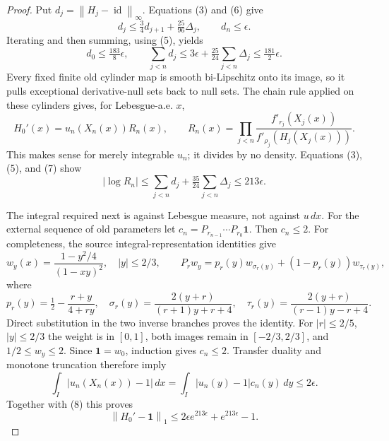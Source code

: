 \documentclass[11pt]{article}
\newcommand{\norm}[1]{\left\lVert#1\right\rVert}
\newcommand{\one}{\mathbf 1}
\DeclareMathOperator{\id}{id}
\begin{document}
\begin{proof}
Put $d_j=\norm{H_j-\id}_\infty$. Equations (3) and (6) give
\[
 d_j\le\tfrac34d_{j+1}+\tfrac{25}{96}\Delta_j,\qquad d_n\le\epsilon.
\]
Iterating and then summing, using (5), yields
\[
 d_0\le\tfrac{183}{8}\epsilon,\qquad
 \sum_{j<n}d_j\le3\epsilon+\tfrac{25}{24}\sum_{j<n}\Delta_j
                  \le\tfrac{181}{2}\epsilon.          \tag{7}\label{eq:d}
\]
Every fixed finite old cylinder map is smooth bi-Lipschitz onto its image,
so it pulls exceptional derivative-null sets back to null sets. The chain
rule applied on these cylinders gives, for Lebesgue-a.e. $x$,
\[
 H_0'(x)=u_n(X_n(x))R_n(x),\qquad
 R_n(x)=\prod_{j<n}
   \frac{f'_{r_j}(X_j(x))}{f'_{\rho_j}(H_j(X_j(x)))}.
\]
This makes sense for merely integrable $u_n$; it divides by no density.
Equations (3), (5), and (7) show
\[
 |\log R_n|\le\sum_{j<n}d_j+\tfrac{35}{24}\sum_{j<n}\Delta_j
                 \le213\epsilon.                     \tag{8}\label{eq:log}
\]

The integral required next is against Lebesgue measure, not against $u\,dx$.
For the external sequence of old parameters let
$c_n=P_{r_{n-1}}\cdots P_{r_0}\one$. Then $c_n\le2$. For completeness, the
source integral-representation identities \cite[Section~4.1]{BKZ} give
\[
 w_y(x)=\frac{1-y^2/4}{(1-xy)^2},\quad |y|\le2/3,\qquad
 P_rw_y=p_r(y)w_{\sigma_r(y)}+(1-p_r(y))w_{\tau_r(y)},
\]
where
\[
 p_r(y)=\tfrac12-\frac{r+y}{4+ry},\quad
 \sigma_r(y)=\frac{2(y+r)}{(r+1)y+r+4},\quad
 \tau_r(y)=\frac{2(y+r)}{(r-1)y-r+4}.
\]
Direct substitution in the two inverse branches proves the identity.
For $|r|\le2/5$, $|y|\le2/3$ the weight is in $[0,1]$, both images remain
in $[-2/3,2/3]$, and $1/2\le w_y\le2$.
Since $\one=w_0$, induction gives $c_n\le2$.
Transfer duality and monotone truncation therefore imply
\[
 \int_I|u_n(X_n(x))-1|\,dx
   =\int_I|u_n(y)-1|c_n(y)\,dy\le2\epsilon.
\]
Together with (8) this proves
\[
 \norm{H_0'-\one}_1\le2\epsilon e^{213\epsilon}+e^{213\epsilon}-1.
                                                               \tag{9}\label{eq:derivative}
\]


\end{proof}
\end{document}
